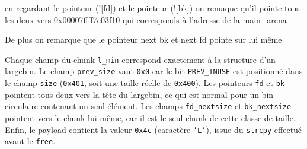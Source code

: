 en regardant le pointeur (!\textcolor{pwndbgblue}[fd]) et le pointeur  (!\textcolor{pwndbgblue}[bk])
on remaque qu'il pointe tous les deux vers 0x00007ffff7e03f10 qui corresponds à l'adresse
de la main\_arena

De plus on remarque que le pointeur next bk et next fd pointe sur lui même

Chaque champ du chunk \texttt{l\_min} correspond exactement à la structure d’un largebin.
Le champ \texttt{prev\_size} vaut \texttt{0x0} car le bit \texttt{PREV\_INUSE} est positionné dans
le champ \texttt{size} (\texttt{0x401}, soit une taille réelle de \texttt{0x400}). Les pointeurs
\texttt{fd} et \texttt{bk} pointent tous deux vers la tête du largebin, ce qui est normal pour un
bin circulaire contenant un seul élément. Les champs \texttt{fd\_nextsize} et \texttt{bk\_nextsize}
pointent vers le chunk lui-même, car il est le seul chunk de cette classe de taille. Enfin, le
payload contient la valeur \texttt{0x4c} (caractère \texttt{'L'}), issue du \texttt{strcpy} effectué
avant le \texttt{free}.

